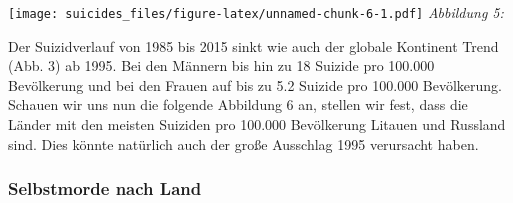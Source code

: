 \documentclass[]{article}
\begin{document}
\texttt{[image: suicides\_files/figure-latex/unnamed-chunk-6-1.pdf]}
\emph{Abbildung 5: }

Der Suizidverlauf von 1985 bis 2015 sinkt wie auch der globale Kontinent
Trend (Abb. 3) ab 1995. Bei den Männern bis hin zu 18 Suizide pro
100.000 Bevölkerung und bei den Frauen auf bis zu 5.2 Suizide pro
100.000 Bevölkerung. Schauen wir uns nun die folgende Abbildung 6 an,
stellen wir fest, dass die Länder mit den meisten Suiziden pro 100.000
Bevölkerung Litauen und Russland sind. Dies könnte natürlich auch der
große Ausschlag 1995 verursacht haben.

\hypertarget{selbstmorde-nach-land}{%
\subsubsection{Selbstmorde nach Land}\label{selbstmorde-nach-land}}
\end{document}
